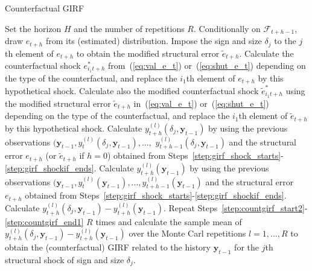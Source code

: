 \documentclass[nojss]{jss}
\begin{document}
\begin{algorithm}[!ht]
\caption{Counterfactual GIRF}
\begin{algorithmic}[1]\label{algo:countgirf}
  \STATE Set the horizon $H$ and the number of repetitions $R$.
  \label{step:countgirf_start2}
    \STATE Conditionally on $\mathcal{F}_{t+h-1}$, draw $e_{t+h}$ from its (estimated) distribution.\label{step:girf_shock_starts}
      \STATE Impose the sign and size $\delta_j$ to the $j$th element of $e_{t+h}$ to obtain the modified structural error $\tilde{e}_{t+h}$.
    \ENDIF
    \label{step:girf_count_starts}
      \STATE Calculate the counterfactual shock $e_{i_1t+h}^*$ from~(\ref{eq:val_e_t}) or~(\ref{eq:shut_e_t}) depending on the type of the counterfactual, and replace the $i_1$th element of $e_{t+h}$ by this hypothetical shock.
        \STATE Calculate also the modified counterfactual shock $\tilde{e}_{i_1t+h}^*$ using the modified structural error $\tilde{e}_{t+h}$  in~(\ref{eq:val_e_t}) or~(\ref{eq:shut_e_t}) depending on the type of the counterfactual, and replace the $i_1$th element of $\tilde{e}_{t+h}$ by this hypothetical shock.
      \ENDIF
    \ENDIF\label{step:girf_shockif_ends}
  \STATE Calculate $y_{t+h}^{(l)}(\delta_j,\boldsymbol{y}_{t-1})$ by using the previous observations $(\boldsymbol{y}_{t-1},y_{t}^{(l)}(\delta_j,\boldsymbol{y}_{t-1}),...,$ $y_{t+h-1}^{(l)}(\delta_j,\boldsymbol{y}_{t-1})$ and the structural error $e_{t+h}$ (or $\tilde{e}_{t+h}$ if $h=0$) obtained from Steps~\ref{step:girf_shock_starts}-\ref{step:girf_shockif_ends}.
  \STATE Calculate $y_{t+h}^{(l)}(\boldsymbol{y}_{t-1})$ by using the previous observations $(\boldsymbol{y}_{t-1},y_{t}^{(l)}(\boldsymbol{y}_{t-1}),...,y_{t+h-1}^{(l)}(\boldsymbol{y}_{t-1})$ and the structural error $e_{t+h}$ obtained from Steps~\ref{step:girf_shock_starts}-\ref{step:girf_shockif_ends}.
  \ENDFOR
\STATE Calculate $y_{t+h}^{(l)}(\delta_j,\boldsymbol{y}_{t-1}) - y_{t+h}^{(l)}(\boldsymbol{y}_{t-1})$.\label{step:countgirf_end1}
\STATE Repeat Steps~\ref{step:countgirf_start2}-\ref{step:countgirf_end1} $R$ times and calculate the sample mean of $y_{t+h}^{(l)}(\delta_j,\boldsymbol{y}_{t-1}) - y_{t+h}^{(l)}(\boldsymbol{y}_{t-1})$ over the Monte Carl repetitions $l=1,...,R$ to obtain the (counterfactual) GIRF related to the history $\boldsymbol{y}_{t-1}$ for the $j$th structural shock of sign and size $\delta_j$.
\end{algorithmic}
\end{algorithm}
\end{document}
